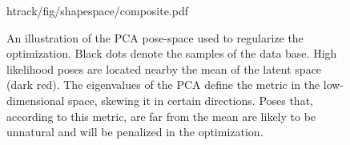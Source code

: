 \begin{figure}[t]
\centering
\begin{overpic} 
[width=\linewidth]
{htrack/fig/shapespace/composite.pdf}
\putfilename
\end{overpic}
\caption{An illustration of the PCA pose-space used to regularize the optimization. Black dots denote the samples of the data base. 
High likelihood poses are located nearby the mean of the latent space (dark red). 
The eigenvalues of the PCA define the metric in the low-dimensional space, skewing it in certain directions. Poses that, according to this metric, are far from the mean are likely to be unnatural and will be penalized in the optimization.
}
\label{fig:shapespace}
\end{figure}